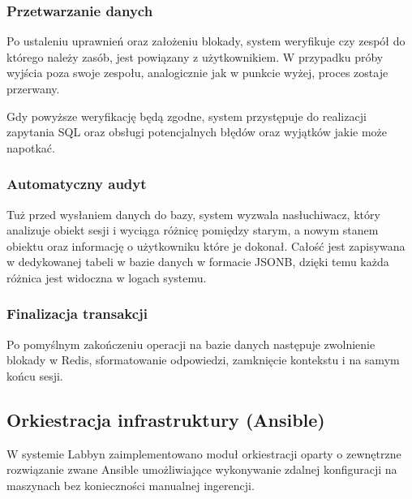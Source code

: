 \subsubsection{Przetwarzanie danych}
\par
Po ustaleniu uprawnień oraz założeniu blokady, system weryfikuje czy zespół do którego należy zasób, jest powiązany z użytkownikiem.
W przypadku próby wyjścia poza swoje zespołu, analogicznie jak w punkcie wyżej, proces zostaje przerwany.
\par
Gdy powyższe weryfikację będą zgodne, system przystępuje do realizacji zapytania SQL oraz obsługi potencjalnych błędów oraz wyjątków jakie może napotkać.
\subsubsection{Automatyczny audyt}
\par
Tuż przed wysłaniem danych do bazy, system wyzwala nasłuchiwacz, który analizuje obiekt sesji i wyciąga różnicę pomiędzy starym, a nowym stanem obiektu oraz informację o użytkowniku które je dokonał.
Całość jest zapisywana w dedykowanej tabeli w bazie danych w formacie \gls{JSONB}, dzięki temu każda różnica jest widoczna w logach systemu.
\subsubsection{Finalizacja transakcji}
\par
Po pomyślnym zakończeniu operacji na bazie danych następuje zwolnienie blokady w \gls{Redis}, sformatowanie odpowiedzi, zamknięcie kontekstu i na samym końcu sesji.
\subsection{Orkiestracja infrastruktury (Ansible)}
W systemie \gls{Labbyn} zaimplementowano moduł orkiestracji oparty o zewnętrzne rozwiązanie zwane \gls{Ansible} umożliwiające wykonywanie zdalnej konfiguracji na maszynach bez konieczności manualnej ingerencji.
